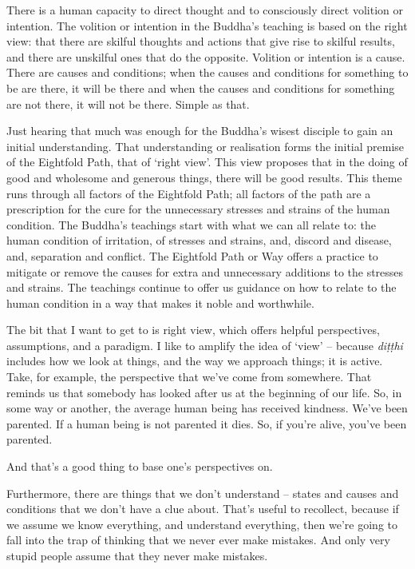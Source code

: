 \bigskip

There is a human capacity to direct thought and to consciously direct volition
or intention. The volition or intention in the Buddha's teaching is based on the
right view: that there are skilful thoughts and actions that give rise to
skilful results, and there are unskilful ones that do the opposite. Volition or
intention is a cause. There are causes and conditions; when the causes and
conditions for something to be are there, it will be there and when the causes
and conditions for something are not there, it will not be there. Simple as that.

\enlargethispage*{\baselineskip}

Just hearing that much was enough for the Buddha's wisest disciple to gain an
initial understanding. That understanding or realisation forms the initial
premise of the Eightfold Path, that of `right view'. This view proposes that in
the doing of good and wholesome and generous things, there will be good results.
This theme runs through all factors of the Eightfold Path; all factors of the
path are a prescription for the cure for the unnecessary stresses and strains of
the human condition. The Buddha's teachings start with what we can
all relate to: the human condition of irritation, of stresses and strains, and,
discord and disease, and, separation and conflict. The Eightfold Path or Way
offers a practice to mitigate or remove the causes for extra and unnecessary
additions to the stresses and strains. The teachings continue to offer
us guidance on how to relate to the human condition in a way that makes it
noble and worthwhile.

The bit that I want to get to is right view, which offers helpful perspectives,
assumptions, and a paradigm. I like to amplify the idea of `view' -- because
\emph{diṭṭhi} includes how we look at things, and the way we approach things; it
is active. Take, for example, the perspective that we've come from somewhere.
That reminds us that somebody has looked after us at the beginning of our life.
So, in some way or another, the average human being has received kindness. We've
been parented. If a human being is not parented it dies. So, if you're alive,
you've been parented.

And that's a good thing to base one's perspectives on.

Furthermore, there are things that we don't understand -- states and causes and
conditions that we don't have a clue about. That's useful to recollect, because
if we assume we know everything, and understand everything, then we're going to
fall into the trap of thinking that we never ever make mistakes. And only very
stupid people assume that they never make mistakes.


